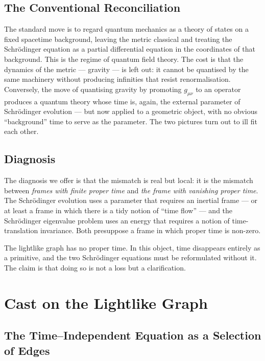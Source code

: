 \documentclass[11pt]{article}
\begin{document}
\subsection{The Conventional Reconciliation}

The standard move is to regard quantum mechanics as a theory of states on a fixed spacetime background, leaving the metric classical and treating the Schr\"odinger equation as a partial differential equation in the coordinates of that background. This is the regime of quantum field theory. The cost is that the dynamics of the metric --- gravity --- is left out: it cannot be quantised by the same machinery without producing infinities that resist renormalisation. Conversely, the move of quantising gravity by promoting $g_{\mu\nu}$ to an operator produces a quantum theory whose time is, again, the external parameter of Schr\"odinger evolution --- but now applied to a geometric object, with no obvious ``background'' time to serve as the parameter. The two pictures turn out to ill fit each other.

\subsection{Diagnosis}

The diagnosis we offer is that the mismatch is real but local: it is the mismatch between \emph{frames with finite proper time} and \emph{the frame with vanishing proper time}. The Schr\"odinger evolution uses a parameter that requires an inertial frame --- or at least a frame in which there is a tidy notion of ``time flow'' --- and the Schr\"odinger eigenvalue problem uses an energy that requires a notion of time-translation invariance. Both presuppose a frame in which proper time is non-zero.

The lightlike graph has no proper time. In this object, time disappears entirely as a primitive, and the two Schr\"odinger equations must be reformulated without it. The claim is that doing so is not a loss but a clarification.

\section{Cast on the Lightlike Graph}
\label{sec:cast}

\subsection{The Time--Independent Equation as a Selection of Edges}
\end{document}
